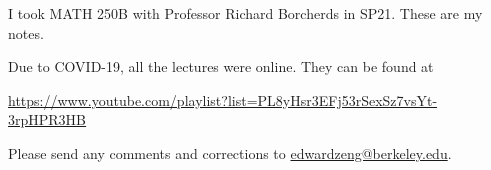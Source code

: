 I took MATH 250B with Professor Richard Borcherds in SP21. These are my notes.

Due to COVID-19, all the lectures were online. They can be found at
\begin{center}
    \url{https://www.youtube.com/playlist?list=PL8yHsr3EFj53rSexSz7vsYt-3rpHPR3HB}
\end{center}

Please send any comments and corrections to \url{edwardzeng@berkeley.edu}.

